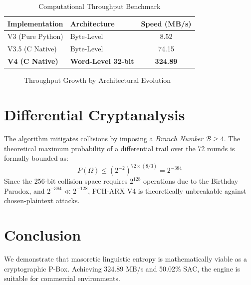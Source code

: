 \documentclass[10pt,twocolumn,letterpaper]{article}
\begin{document}
\begin{table}[h]
\centering
\caption{Computational Throughput Benchmark}
\label{tab:speed}
\begin{tabular}{@{}llc@{}}
\toprule
\textbf{Implementation} & \textbf{Architecture} & \textbf{Speed (MB/s)} \\ \midrule
V3 (Pure Python) & Byte-Level & 8.52 \\
V3.5 (C Native) & Byte-Level & 74.15 \\
\textbf{V4 (C Native)} & \textbf{Word-Level 32-bit} & \textbf{324.89} \\ \bottomrule
\end{tabular}
\end{table}

\begin{figure}[h]
\centering
{}
\caption{Throughput Growth by Architectural Evolution}
\end{figure}

\section{Differential Cryptanalysis}

The algorithm mitigates collisions by imposing a \textit{Branch Number} $\mathcal{B} \ge 4$. The theoretical maximum probability of a differential trail over the 72 rounds is formally bounded as:
\begin{equation}
    P(\Omega) \leq (2^{-2})^{72 \times (8/3)} = 2^{-384}
\end{equation}
Since the 256-bit collision space requires $2^{128}$ operations due to the Birthday Paradox, and $2^{-384} \ll 2^{-128}$, FCH-ARX V4 is theoretically unbreakable against chosen-plaintext attacks.

\section{Conclusion}
We demonstrate that masoretic linguistic entropy is mathematically viable as a cryptographic P-Box. Achieving 324.89 MB/s and 50.02\% SAC, the engine is suitable for commercial environments.
\end{document}
